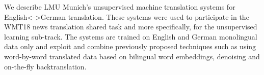 We describe LMU Munich's unsupervised machine translation systems for English<->German translation. These systems were used to participate in the WMT18 news translation shared task and more specifically, for the unsupervised learning sub-track. The systems are trained on English and German monolingual data only and exploit and combine previously proposed techniques such as using word-by-word translated data based on bilingual word embeddings, denoising and on-the-fly backtranslation.
